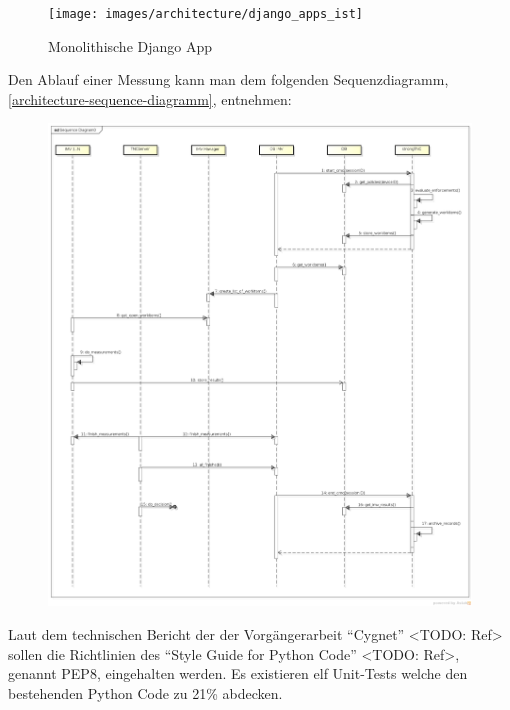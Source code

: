 \begin{figure}[H]
	\centering
	\texttt{[image: images/architecture/django\_apps\_ist]}
    \caption{Monolithische Django App}
    \label{django-ist-diagram}
\end{figure}

Den Ablauf einer Messung kann man dem folgenden Sequenzdiagramm,
\autoref{architecture-sequence-diagramm}, entnehmen:
\begin{figure}[H]
	\centering
	\includegraphics[width=\textwidth]{./images/architecture/architecture_sequence_diagramm-2014-03-12}
	\caption{}
	\label{architecture-sequence-diagramm}
\end{figure}

Laut dem technischen Bericht der der Vorgängerarbeit \enquote{Cygnet} <TODO:
Ref> sollen die Richtlinien des \enquote{Style Guide for Python Code} <TODO:
Ref>, genannt PEP8, eingehalten werden. Es existieren elf Unit-Tests welche den
bestehenden Python Code zu 21\% abdecken.\\


